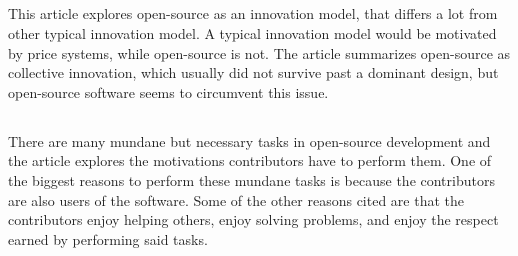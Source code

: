\documentclass[12pt,letterpaper]{article}
\begin{document}
\subsection*{}
This article explores open-source as an innovation model, that differs a lot from other typical innovation model. A typical innovation model would be motivated by price systems, while open-source is not. The article summarizes open-source as collective innovation, which usually did not survive past a dominant design, but open-source software seems to circumvent this issue.

\subsection*{}
There are many mundane but necessary tasks in open-source development and the article explores the motivations contributors have to perform them. One of the biggest reasons to perform these mundane tasks is because the contributors are also users of the software. Some of the other reasons cited are that the contributors enjoy helping others, enjoy solving problems, and enjoy the respect earned by performing said tasks.

 
\end{document}
